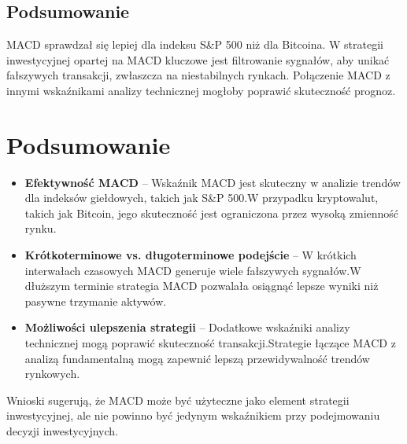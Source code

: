 \documentclass[12pt, letterpaper]{article}
\begin{document}
\subsection{Podsumowanie}
MACD sprawdzał się lepiej dla indeksu S\&P 500 niż dla Bitcoina.
W strategii inwestycyjnej opartej na MACD kluczowe jest filtrowanie sygnałów, aby unikać fałszywych transakcji, zwłaszcza na niestabilnych rynkach.
Połączenie MACD z innymi wskaźnikami analizy technicznej mogłoby poprawić skuteczność prognoz.

\vspace{2cm} 
\section{Podsumowanie}
\begin{itemize}
    \item \textbf{Efektywność MACD} – Wskaźnik MACD jest skuteczny w analizie trendów dla indeksów giełdowych, takich jak S\&P 500.W przypadku kryptowalut, takich jak Bitcoin, jego skuteczność jest ograniczona przez wysoką zmienność rynku.
    \item \textbf{Krótkoterminowe vs. długoterminowe podejście} – W krótkich interwałach czasowych MACD generuje wiele fałszywych sygnałów.W dłuższym terminie strategia MACD pozwalała osiągnąć lepsze wyniki niż pasywne trzymanie aktywów.
    \item \textbf{Możliwości ulepszenia strategii} – Dodatkowe wskaźniki analizy technicznej mogą poprawić skuteczność transakcji.Strategie łączące MACD z analizą fundamentalną mogą zapewnić lepszą przewidywalność trendów rynkowych.
\end{itemize}
Wnioski sugerują, że MACD może być użyteczne jako element strategii inwestycyjnej, ale nie powinno być jedynym wskaźnikiem przy podejmowaniu decyzji inwestycyjnych.
\end{document}
